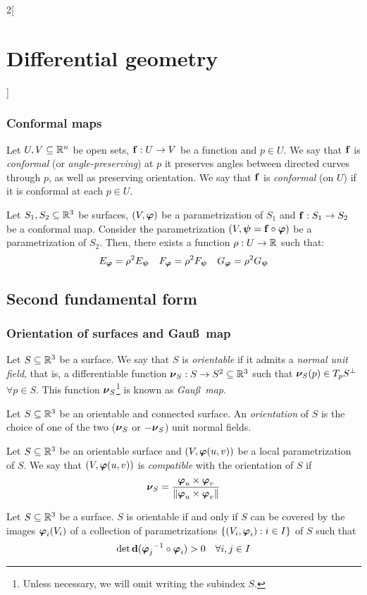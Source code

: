 \documentclass[../../../main_math.tex]{subfiles}
\begin{document}
\begin{multicols}{2}[\section{Differential geometry}]
  \subsubsection{Conformal maps}
  \begin{definition}
    Let $U,V\subseteq\mathbb{R}^n$ be open sets, $\boldsymbol{\mathrm{f}}:U\rightarrow V$ be a function and $p\in U$. We say that $\boldsymbol{\mathrm{f}}$ is \emph{conformal} (or \emph{angle-preserving}) at $p$ it preserves angles between directed curves through $p$, as well as preserving orientation. We say that $\boldsymbol{\mathrm{f}}$ is \emph{conformal} (on $U$) if it is conformal at each $p\in U$.
  \end{definition}
  \begin{theorem}
    Let $S_1,S_2\subseteq\mathbb{R}^3$ be surfaces, $(V,\boldsymbol{\mathrm{\varphi}})$ be a parametrization of $S_1$ and $\boldsymbol{\mathrm{f}}:S_1\rightarrow S_2$ be a conformal map. Consider the parametrization $(V,\boldsymbol{\mathrm{\psi}}=\boldsymbol{\mathrm{f}}\circ\boldsymbol{\mathrm{\varphi}})$ be a parametrization of $S_2$. Then, there exists a function $\rho:U\rightarrow\mathbb{R}$ such that:
    $$E_{\boldsymbol{\mathrm{\varphi}}}=\rho^2 E_{\boldsymbol{\mathrm{\psi}}}\quad F_{\boldsymbol{\mathrm{\varphi}}}=\rho^2 F_{\boldsymbol{\mathrm{\psi}}}\quad G_{\boldsymbol{\mathrm{\varphi}}}=\rho^2 G_{\boldsymbol{\mathrm{\psi}}}$$
  \end{theorem}
  \subsection{Second fundamental form}
  \subsubsection{Orientation of surfaces and Gau\ss\ map}
  \begin{definition}
    Let $S\subseteq\mathbb{R}^3$ be a surface. We say that $S$ is \emph{orientable} if it admits a \emph{normal unit field}, that is, a differentiable function $\boldsymbol{\mathrm{\nu}}_S:S\rightarrow S^2\subseteq\mathbb{R}^3$ such that $\boldsymbol{\mathrm{\nu}}_S(p)\in T_pS^\perp$ $\forall p\in S$. This function $\boldsymbol{\mathrm{\nu}}_S$\footnote{Unless necessary, we will omit writing the subindex $S$.} is known as \emph{Gau\ss\ map}.
  \end{definition}
  \begin{definition}
    Let $S\subseteq\mathbb{R}^3$ be an orientable and connected surface. An \emph{orientation} of $S$ is the choice of one of the two ($\boldsymbol{\mathrm{\nu}}_S$ or $-\boldsymbol{\mathrm{\nu}}_S$) unit normal fields.
  \end{definition}
  \begin{definition}
    Let $S\subseteq\mathbb{R}^3$ be an orientable surface and $(V,\boldsymbol{\mathrm{\varphi}}(u,v))$ be a local parametrization of $S$. We say that $(V,\boldsymbol{\mathrm{\varphi}}(u,v))$ is \emph{compatible} with the orientation of $S$ if $$\boldsymbol{\mathrm{\nu}}_S=\frac{\boldsymbol{\mathrm{\varphi}}_u\times\boldsymbol{\mathrm{\varphi}}_v}{\|\boldsymbol{\mathrm{\varphi}}_u\times\boldsymbol{\mathrm{\varphi}}_v\|}$$
  \end{definition}
  \begin{proposition}
    Let $S\subseteq\mathbb{R}^3$ be a surface. $S$ is orientable if and only if $S$ can be covered by the images $\boldsymbol{\mathrm{\varphi}}_i(V_i)$ of a collection of parametrizations $\{(V_i,\boldsymbol{\mathrm{\varphi}}_i):i\in I\}$ of $S$ such that $$\det\boldsymbol{\mathrm{\dd}}({\boldsymbol{\mathrm{\varphi}}_j}^{-1}\circ\boldsymbol{\mathrm{\varphi}}_i)>0\quad\forall i,j\in I$$
  \end{proposition}

\end{multicols}
\end{document}
